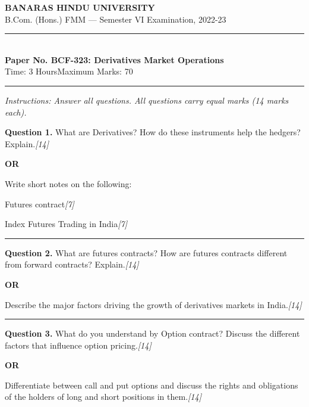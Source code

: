 \documentclass[11pt,a4paper]{article}
\newcommand{\pts}[1]{\hfill   \textit{[#1]}}
\begin{document}
\begin{center}
  {\large\bfseries BANARAS HINDU UNIVERSITY}\\[2pt]
  {\normalsize B.Com. (Hons.) FMM --- Semester VI Examination, 2022-23}\\[6pt]
  \rule{0.8\linewidth}{0.5pt}\\[6pt]
  {\large\bfseries Paper No. BCF-323: Derivatives Market Operations}\\[4pt]
  {\normalsize Time: 3 Hours\hfill Maximum Marks: 70}
\end{center}

\rule{\linewidth}{0.4pt}

\smallskip



\noindent   \textit{Instructions: Answer all questions. All questions carry equal marks (14 marks each).}

\bigskip




\noindent   \textbf{Question 1.}
What are Derivatives? How do these instruments help the hedgers? Explain.\pts{14}

\centerline{   \textbf{OR}}

Write short notes on the following:

\begin{parts}
  \item Futures contract\pts{7}
  \item Index Futures Trading in India\pts{7}
\end{parts}

\medskip\rule{\linewidth}{0.2pt}




\noindent   \textbf{Question 2.}
What are futures contracts? How are futures contracts different from forward contracts? Explain.\pts{14}

\centerline{   \textbf{OR}}

Describe the major factors driving the growth of derivatives markets in India.\pts{14}

\medskip\rule{\linewidth}{0.2pt}




\noindent   \textbf{Question 3.}
What do you understand by Option contract? Discuss the different factors that influence option pricing.\pts{14}

\centerline{   \textbf{OR}}

Differentiate between call and put options and discuss the rights and obligations of the holders of long and short positions in them.\pts{14}
\end{document}
